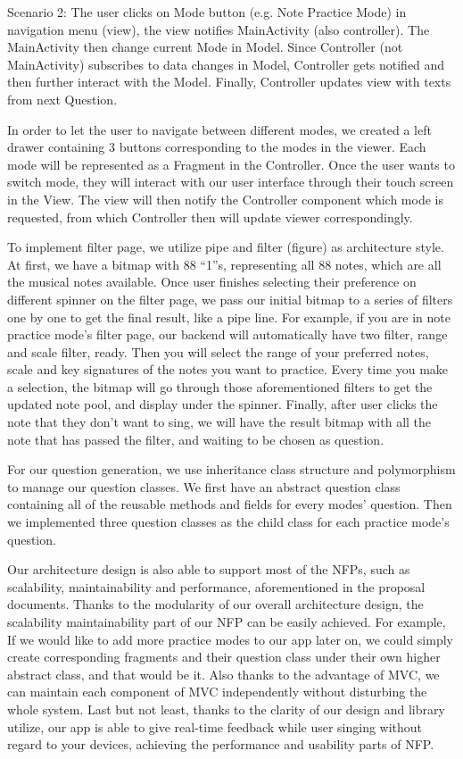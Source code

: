 \documentclass{article}
\begin{document}
Scenario 2:
The user clicks on Mode button (e.g. Note Practice Mode) in navigation menu (view), the view notifies MainActivity (also controller). The MainActivity then change current Mode in Model. Since Controller (not MainActivity) subscribes to data changes in Model, Controller gets notified and then further interact with the Model. Finally, Controller updates view with texts from next Question.


In order to let the user to navigate between different modes, we created a left drawer containing 3 buttons corresponding to the modes in the viewer. Each mode will be represented as a Fragment in the Controller. Once the user wants to switch mode, they will interact with our user interface through their touch screen in the View. The view will then notify the Controller component which mode is requested, from which Controller then will update viewer correspondingly.

To implement filter page, we utilize pipe and filter (figure) as architecture style. At first, we have a bitmap with 88 “1”s, representing all 88 notes, which are all the musical notes available. Once user finishes selecting their preference on different spinner on the filter page, we pass our initial bitmap to a series of filters one by one to get the final result, like a pipe line. For example, if you are in note practice mode’s filter page, our backend will automatically have two filter, range and scale filter, ready. Then you will select the range of your preferred notes, scale and key signatures of the notes you want to practice. Every time you make a selection, the bitmap will go through those aforementioned filters to get the updated note pool, and display under the spinner. Finally, after user clicks the note that they don’t want to sing, we will have the result bitmap with all the note that has passed the filter, and waiting to be chosen as question.

For our question generation, we use inheritance class structure and polymorphism to manage our question classes. We first have an abstract question class containing all of the reusable methods and fields for every modes’ question. Then we implemented three question classes as the child class for each practice mode’s question. 
 
Our architecture design is also able to support most of the NFPs, such as scalability, maintainability and performance, aforementioned in the proposal documents. Thanks to the modularity of our overall architecture design, the scalability maintainability part of our NFP can be easily achieved. For example, If we would like to add more practice modes to our app later on, we could simply create corresponding fragments and their question class under their own higher abstract class, and that would be it. Also thanks to the advantage of MVC, we can maintain each component of MVC independently without disturbing the whole system. Last but not least, thanks to the clarity of our design and library utilize, our app is able to give real-time feedback while user singing without regard to your devices, achieving the performance and usability parts of NFP.
\end{document}
